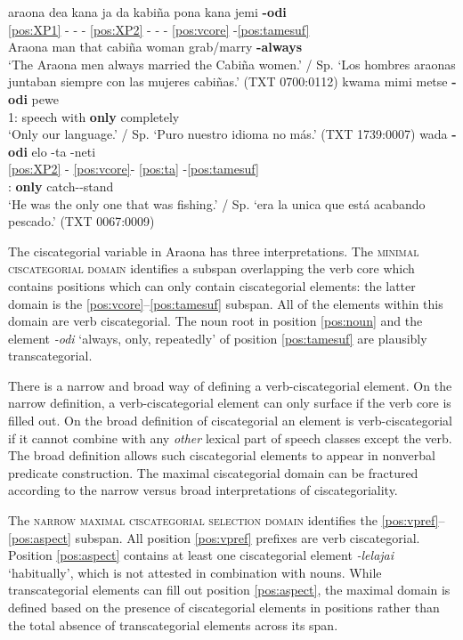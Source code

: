\documentclass[output=paper,hidelinks]{langscibook}
\begin{document}
\ea 
 \ea\label{ex:odi1}
    \glll araona dea kana ja da kabiña pona kana jemi \textbf{-odi} \\
    \ref{pos:XP1} - - - \ref{pos:XP2} - - - \ref{pos:vcore} -\ref{pos:tamesuf} \\
    Araona man \Pl{} \Erg{} that cabiña woman \Pl{} grab/marry \textbf{-always}  \\
    \glt `The Araona men always married the Cabiña women.' / Sp. `Los hombres araonas juntaban siempre con las mujeres cabiñas.'  \hfill (TXT 0700:0112)
 \ex \label{ex:odi2}
    \gll kwama mimi metse \textbf{-odi} pewe \\
    1\Pl{}:\Gen{} speech with \textbf{only} completely  \\
    \glt `Only our language.' / Sp. `Puro nuestro idioma no más.'  \hfill (TXT 1739:0007)
 \ex \label{ex:odi3}
    \glll wada \textbf{-odi} elo -ta -neti	 \\
     \ref{pos:XP2} - \ref{pos:vcore}- \ref{pos:ta} -\ref{pos:tamesuf} \\
     \Tsg{}:\Erg{} \textbf{only} catch-\Third\Aarg{}-stand   \\
    \glt `He was the only one that was fishing.' / Sp. `era la unica que está acabando pescado.'  \hfill (TXT 0067:0009)
 \z
\z 

The ciscategorial variable in Araona has three interpretations. The \textsc{minimal ciscategorial domain} identifies a subspan overlapping the verb core which contains positions which can only contain ciscategorial elements: the latter domain is the \ref{pos:vcore}--\ref{pos:tamesuf} subspan. All of the elements within this domain are verb ciscategorial. The noun root in position \ref{pos:noun} and the element \textit{-odi} `always, only, repeatedly' of position \ref{pos:tamesuf} are plausibly transcategorial.

There is a narrow and broad way of defining a verb-ciscategorial element. On the narrow definition, a verb-ciscategorial element can only surface if the verb core is filled out. On the broad definition of ciscategorial an element is verb-ciscategorial if it cannot combine with any \textit{other} lexical part of speech classes except the verb. The broad definition allows such ciscategorial elements to appear in nonverbal predicate construction. The maximal ciscategorial domain can be fractured according to the narrow versus broad interpretations of ciscategoriality. 

The \textsc{narrow maximal ciscategorial selection domain} identifies the \ref{pos:vpref}--\ref{pos:aspect} subspan. All position \ref{pos:vpref} prefixes are verb ciscategorial. Position \ref{pos:aspect} contains at least one ciscategorial element \textit{-lelajai} `habitually', which is not attested in combination with nouns. While transcategorial elements can fill out position \ref{pos:aspect}, the maximal domain is defined based on the presence of ciscategorial elements in positions rather than the total absence of transcategorial elements across its span.
\end{document}
